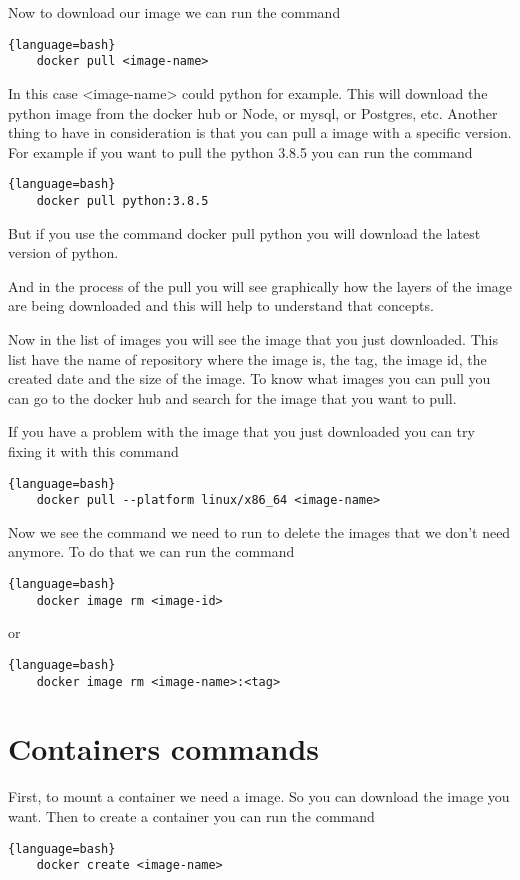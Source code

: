 \documentclass{article}
\begin{document}
Now to download our image we can run the command
\begin{lstlisting}{language=bash}
    docker pull <image-name>
\end{lstlisting}

In this case <image-name> could python for example. This will download the python image from the docker hub or Node, or mysql, or Postgres, etc.
Another thing to have in consideration is that you can pull a image with a specific version. For example if you want to pull the python 3.8.5 
you can run the command
\begin{lstlisting}{language=bash}
    docker pull python:3.8.5
\end{lstlisting}

But if you use the command docker pull python you will download the latest version of python.

And in the process of the pull you will see graphically how the layers of the image are being downloaded and this will help to understand that concepts.

Now in the list of images you will see the image that you just downloaded. This list have the name of repository where the image is, the tag, the image id, 
the created date and the size of the image. To know what images you can pull you can go to the docker hub and search for the image that you want to pull.

If you have a problem with the image that you just downloaded you can try fixing it with this command 
\begin{lstlisting}{language=bash}
    docker pull --platform linux/x86_64 <image-name> 
\end{lstlisting}

Now we see the command we need to run to delete the images that we don't need anymore. To do that we can run the command
\begin{lstlisting}{language=bash}
    docker image rm <image-id>
\end{lstlisting}
or 
\begin{lstlisting}{language=bash}
    docker image rm <image-name>:<tag> 
\end{lstlisting}

\section*{Containers commands}
First, to mount a container we need a image. So you can download the image you want. Then to create
a container you can run the command
\begin{lstlisting}{language=bash}
    docker create <image-name>
\end{lstlisting}
\end{document}
